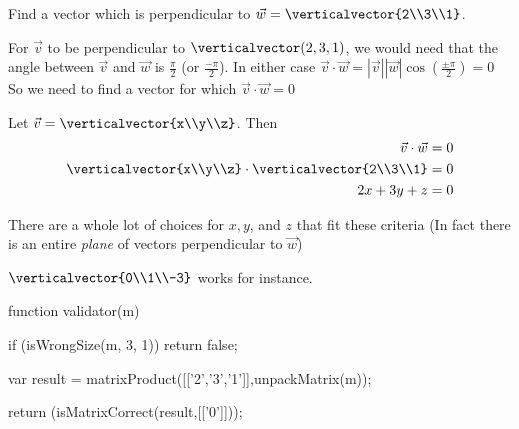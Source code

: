 \documentclass{ximera}
\begin{document}
\begin{question}
  Find a vector which is perpendicular to $\vec{w} = \verticalvector{2\\3\\1}$.  
  \begin{solution}
    \begin{hint}
      For $\vec{v}$ to be perpendicular to $\verticalvector(2,3,1)$, we would need that the angle between $\vec{v}$ and $\vec{w}$ is $\frac{\pi}{2}$ (or $\frac{-\pi}{2}$).
      In either case $\vec{v}\cdot\vec{w} = |\vec{v}||\vec{w}|\cos(\frac{\pm \pi}{2}) = 0$
      So we need to find a vector for which $\vec{v}\cdot \vec{w}=0$
    \end{hint}
    \begin{hint}
      Let $\vec{v} = \verticalvector{x\\y\\z}$.  Then 
      \begin{align*}
        \vec{v}\cdot\vec{w} &= 0\\
        \verticalvector{x\\y\\z}\cdot\verticalvector{2\\3\\1} &= 0\\
        2x+3y+z &= 0
      \end{align*}
    \end{hint}
    \begin{hint}
      There are a whole lot of choices for $x,y$, and $z$ that fit these criteria (In fact there is an entire \textit{plane} of vectors perpendicular to $\vec{w}$)
    \end{hint}
    \begin{hint}
      $\verticalvector{0\\1\\-3}$ works for instance.
    \end{hint}
    \begin{matrix-answer}
    function validator(m) {
      if (isWrongSize(m, 3, 1)) return false;

      var result = matrixProduct([['2','3','1']],unpackMatrix(m));

      return (isMatrixCorrect(result,[['0']]));
    }
    \end{matrix-answer}
  \end{solution}
\end{question}
\end{document}
